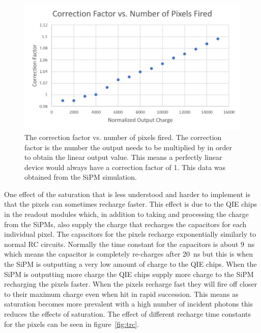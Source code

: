 \begin{figure}
\centering
\includegraphics[width=\linewidth]{Figures/CorFac.png}
\caption{The correction factor vs. number of pixels fired. The correction factor is the number the output needs to be multiplied by in order to obtain the linear output value. This means a perfectly linear device would always have a correction factor of 1. This data was obtained from the SiPM simulation.}
\label{fig:Cor}
\end{figure}

One effect of the saturation that is less understood and harder to implement is that the pixels can sometimes recharge faster. This effect is due to the QIE chips in the readout modules which, in addition to taking and processing the charge from the SiPMs, also supply the charge that recharges the capacitors for each individual pixel. The capacitors for the pixels recharge exponentially similarly to normal RC circuits. Normally the time constant for the capacitors is about 9~ns which means the capacitor is completely re-charges after 20~ns but this is when the SiPM is outputting a very low amount of charge to the QIE chips. When the SiPM is outputting more charge the QIE chips supply more charge to the SiPM recharging the pixels faster. When the pixels recharge fast they will fire off closer to their maximum charge even when hit in rapid succession. This means as saturation becomes more prevalent with a high number of incident photons this reduces the effects of saturation. The effect of different recharge time constants for the pixels can be seen in figure~\ref{fig:trc}.

